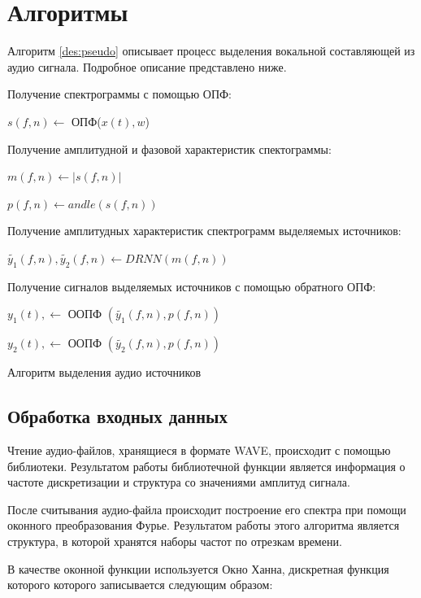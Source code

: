 \section{Алгоритмы}

Алгоритм \ref{des:pseudo} описывает процесс выделения вокальной составляющей из аудио сигнала. Подробное описание представлено ниже.

\begin{algorithm}[H]
	\label{des:pseudo}
	\SetAlgoLined
	
	Получение спектрограммы с помощью ОПФ:
	
	$s(f, n) \leftarrow$ ОПФ($x(t), w$)
		
	Получение амплитудной и фазовой характеристик спектограммы:
	
	$m(f, n) \leftarrow | s(f,n)|$
	
	$p(f, n) \leftarrow andle(s(f,n))$
	
	Получение амплитудных характеристик спектрограмм выделяемых источников:
	
	$\tilde{y_1}(f, n), \tilde{y_2}(f, n) \leftarrow DRNN(m(f, n))$
	
	Получение сигналов выделяемых источников с помощью обратного ОПФ:
	
	$ y_1(t), \leftarrow $ ООПФ $(\tilde{y_1}(f, n), p(f, n))$
	
	$ y_2(t), \leftarrow $ ООПФ $(\tilde{y_2}(f, n), p(f, n))$
	\caption{Алгоритм выделения аудио источников}
\end{algorithm}

\subsection{Обработка входных данных}

Чтение аудио-файлов, хранящиеся в формате WAVE, происходит с помощью библиотеки. Результатом работы библиотечной функции является информация о частоте дискретизации и структура со значениями амплитуд сигнала. 

После считывания аудио-файла происходит построение его спектра при помощи оконного преобразования Фурье. Результатом работы этого алгоритма является структура, в которой хранятся наборы частот по отрезкам времени.

В качестве оконной функции используется Окно Ханна, дискретная функция которого которого записывается следующим образом:

